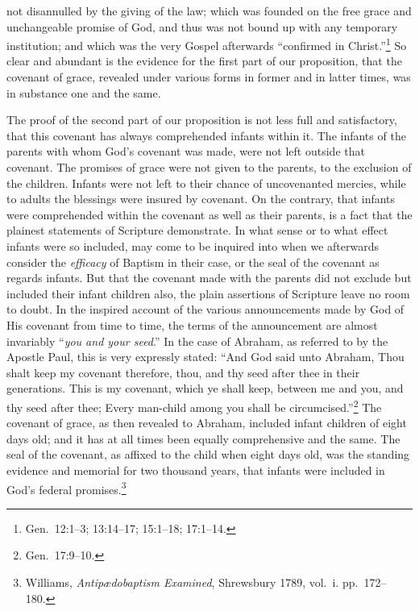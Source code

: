 \documentclass[
]{book}
\begin{document}
not disannulled by the giving of the law; which was founded on the free grace and unchangeable promise of God, and thus was not bound up with any temporary institution; and which was the very Gospel afterwards ``confirmed in Christ.''\footnote{Gen.~12:1--3; 13:14--17; 15:1--18; 17:1--14.} So clear and abundant is the evidence for the first part of our proposition, that the covenant of grace, revealed under various forms in former and in latter times, was in substance one and the same.

The proof of the second part of our proposition is not less full and satisfactory, that this covenant has always comprehended infants within it. The infants of the parents with whom God's covenant was made, were not left outside that covenant. The promises of grace were not given to the parents, to the exclusion of the children. Infants were not left to their chance of uncovenanted mercies, while to adults the blessings were insured by covenant. On the contrary, that infants were comprehended within the covenant as well as their parents, is a fact that the plainest statements of Scripture demonstrate. In what sense or to what effect infants were so included, may come to be inquired into when we afterwards consider the \emph{efficacy} of Baptism in their case, or the seal of the covenant as regards infants. But that the covenant made with the parents did not exclude but included their infant children also, the plain assertions of Scripture leave no room to doubt. In the inspired account of the various announcements made by God of His covenant from time to time, the terms of the announcement are almost invariably ``\emph{you and your seed}.'' In the case of Abraham, as referred to by the Apostle Paul, this is very expressly stated: ``And God said unto Abraham, Thou shalt keep my covenant therefore, thou, and thy seed after thee in their generations. This is my covenant, which ye shall keep, between me and you, and thy seed after thee; Every man-child among you shall be circumcised.''\footnote{Gen.~17:9--10.} The covenant of grace, as then revealed to Abraham, included infant children of eight days old; and it has at all times been equally comprehensive and the same. The seal of the covenant, as affixed to the child when eight days old, was the standing evidence and memorial for two thousand years, that infants were included in God's federal promises.\footnote{Williams, \emph{Antipædobaptism Examined}, Shrewsbury 1789, vol.~i. pp.~172--180.}
\end{document}
